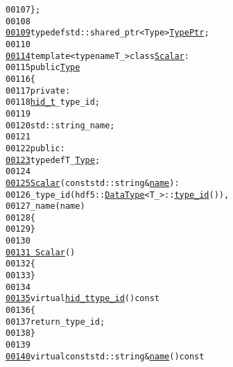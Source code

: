 \begin{footnotesize}
\begin{alltt}
00107         \};
00108 
\hypertarget{hdf5_8hh_source_l00109}{}\hyperlink{namespaceeos_1_1hdf5_ac960ca8a290b8a26ab5f71585ac5d793}{00109}         \textcolor{keyword}{typedef} std::shared\_ptr<Type> \hyperlink{namespaceeos_1_1hdf5_ac960ca8a290b8a26ab5f71585ac5d793}{TypePtr};
00110 
\hypertarget{hdf5_8hh_source_l00114}{}\hyperlink{classeos_1_1hdf5_1_1Scalar}{00114}         \textcolor{keyword}{template} <\textcolor{keyword}{typename} T\_> \textcolor{keyword}{class }\hyperlink{classeos_1_1hdf5_1_1Scalar}{Scalar} :
00115             \textcolor{keyword}{public} \hyperlink{structeos_1_1hdf5_1_1Type}{Type}
00116         \{
00117             \textcolor{keyword}{private}:
00118                 \hyperlink{namespaceeos_1_1hdf5_a5bd5e209f1bf36cdc5551465dacf2e74}{hid_t} \_type\_id;
00119 
00120                 std::string \_name;
00121 
00122             \textcolor{keyword}{public}:
\hypertarget{hdf5_8hh_source_l00123}{}\hyperlink{classeos_1_1hdf5_1_1Scalar_a614de8b7185b626dad906cf347b86f92}{00123}                 \textcolor{keyword}{typedef} T\_ \hyperlink{structeos_1_1hdf5_1_1Type}{Type};
00124 
\hypertarget{hdf5_8hh_source_l00125}{}\hyperlink{classeos_1_1hdf5_1_1Scalar_ab242719c82cdf865766b1e97d8c9666a}{00125}                 \hyperlink{classeos_1_1hdf5_1_1Scalar_ab242719c82cdf865766b1e97d8c9666a}{Scalar}(\textcolor{keyword}{const} std::string & \hyperlink{classeos_1_1hdf5_1_1Scalar_af914b3bd28aa664d17cc6223659c7b45}{name}) :
00126                     \_type\_id(hdf5::\hyperlink{structeos_1_1hdf5_1_1DataType}{DataType}<T\_>::\hyperlink{classeos_1_1hdf5_1_1Scalar_a5d54b43030237b9bc1c7076184ff968d}{type_id}()),
00127                     \_name(name)
00128                 \{
00129                 \}
00130 
\hypertarget{hdf5_8hh_source_l00131}{}\hyperlink{classeos_1_1hdf5_1_1Scalar_a7bc85bf7ef7d9488df0953597bf3254a}{00131}                 \hyperlink{classeos_1_1hdf5_1_1Scalar_a7bc85bf7ef7d9488df0953597bf3254a}{~Scalar}()
00132                 \{
00133                 \}
00134 
\hypertarget{hdf5_8hh_source_l00135}{}\hyperlink{classeos_1_1hdf5_1_1Scalar_a5d54b43030237b9bc1c7076184ff968d}{00135}                 \textcolor{keyword}{virtual} \hyperlink{namespaceeos_1_1hdf5_a5bd5e209f1bf36cdc5551465dacf2e74}{hid_t} \hyperlink{classeos_1_1hdf5_1_1Scalar_a5d54b43030237b9bc1c7076184ff968d}{type_id}()\textcolor{keyword}{ const}
00136 \textcolor{keyword}{                }\{
00137                     \textcolor{keywordflow}{return} \_type\_id;
00138                 \}
00139 
\hypertarget{hdf5_8hh_source_l00140}{}\hyperlink{classeos_1_1hdf5_1_1Scalar_af914b3bd28aa664d17cc6223659c7b45}{00140}                 \textcolor{keyword}{virtual} \textcolor{keyword}{const} std::string & \hyperlink{classeos_1_1hdf5_1_1Scalar_af914b3bd28aa664d17cc6223659c7b45}{name}()\textcolor{keyword}{ const}

\end{alltt}
\end{footnotesize}
